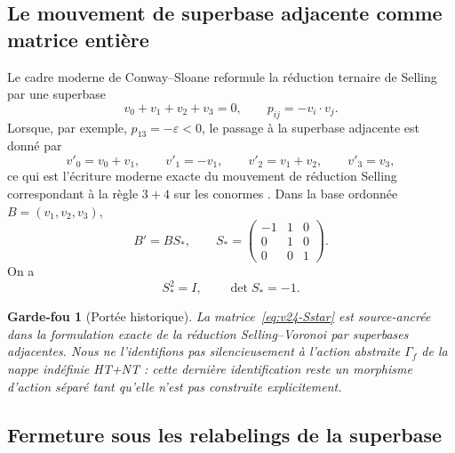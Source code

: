 \documentclass[11pt,a4paper]{article}
\newtheorem{guardrail}[theorem]{Garde-fou}
\begin{document}
\subsection{Le mouvement de superbase adjacente comme matrice entière}

Le cadre moderne de Conway--Sloane reformule la réduction ternaire de Selling par une superbase
\[
 v_0+v_1+v_2+v_3=0,
 \qquad
 p_{ij}=-v_i\!\cdot v_j.
\]
Lorsque, par exemple, $p_{13}=-\varepsilon<0$, le passage à la superbase adjacente est donné par
\[
 v'_0=v_0+v_1,
 \qquad
 v'_1=-v_1,
 \qquad
 v'_2=v_1+v_2,
 \qquad
 v'_3=v_3,
\]
ce qui est l'écriture moderne exacte du mouvement de réduction Selling correspondant à la règle $3+4$ sur les conormes \cite{Selling1874,ConwaySloane1992,Selling43}. Dans la base ordonnée $B=(v_1,v_2,v_3)$,
\begin{equation}\label{eq:v24-Sstar}
 \boxed{
 B'=B S_*,
 \qquad
 S_*=\begin{pmatrix}
 -1&1&0\\
 0&1&0\\
 0&0&1
 \end{pmatrix}.}
\end{equation}
On a
\[
 S_*^2=I,
 \qquad
 \det S_*=-1.
\]

\begin{guardrail}[Portée historique]
La matrice~\eqref{eq:v24-Sstar} est source-ancrée dans la formulation exacte de la réduction Selling--Voronoi par superbases adjacentes. Nous ne l'identifions pas silencieusement à l'action abstraite $\Gamma_f$ de la nappe indéfinie HT+NT : cette dernière identification reste un morphisme d'action séparé tant qu'elle n'est pas construite explicitement.
\end{guardrail}

\subsection{Fermeture sous les relabelings de la superbase}
\end{document}
